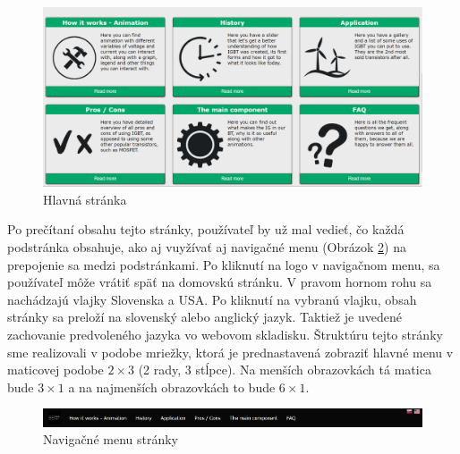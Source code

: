 \begin{figure}[!htbp]
    \centering
    \includegraphics[width=16cm]{img/mainpage.PNG}
    \caption{Hlavná stránka}
    \label{mainpage}
\end{figure}

Po prečítaní obsahu tejto stránky, používateľ by už mal vedieť, čo každá podstránka obsahuje, ako aj vuyžívať aj navigačné menu (Obrázok \ref{navbar}) na prepojenie sa medzi podstránkami. Po kliknutí na logo v navigačnom menu, sa používateľ môže vrátiť späť na domovskú stránku. V pravom hornom rohu sa nachádzajú vlajky Slovenska a USA. Po kliknutí na vybranú vlajku, obsah stránky sa preloží na slovenský alebo anglický jazyk. Taktiež je uvedené zachovanie predvoleného jazyka vo webovom skladisku. Štruktúru tejto stránky sme realizovali v podobe mriežky, ktorá je prednastavená zobraziť hlavné menu v maticovej podobe $2\times 3$ (2 rady, 3 stĺpce). Na menších obrazovkách tá matica bude $3\times 1$ a na najmenších obrazovkách to bude $6\times 1$.

\begin{figure}[!htbp]
    \centering
    \includegraphics[width=16cm]{img/navbar.PNG}
    \caption{Navigačné menu stránky}
    \label{navbar}
\end{figure}

